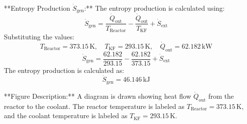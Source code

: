 **Entropy Production \( \dot{S}_{\text{gen}} \):**  
The entropy production is calculated using:  
\[
\dot{S}_{\text{gen}} = \frac{\dot{Q}_{\text{out}}}{T_{\text{Reactor}}} - \frac{\dot{Q}_{\text{out}}}{T_{\text{KF}}} + \dot{S}_{\text{ext}}
\]  
Substituting the values:  
\[
T_{\text{Reactor}} = 373.15 \, \text{K}, \quad T_{\text{KF}} = 293.15 \, \text{K}, \quad \dot{Q}_{\text{out}} = 62.182 \, \text{kW}
\]  
\[
\dot{S}_{\text{gen}} = \frac{62.182}{293.15} - \frac{62.182}{373.15} + \dot{S}_{\text{ext}}
\]  
The entropy production is calculated as:  
\[
\dot{S}_{\text{gen}} = 46.146 \, \text{kJ}
\]  

**Figure Description:**  
A diagram is drawn showing heat flow \( \dot{Q}_{\text{out}} \) from the reactor to the coolant. The reactor temperature is labeled as \( T_{\text{Reactor}} = 373.15 \, \text{K} \), and the coolant temperature is labeled as \( T_{\text{KF}} = 293.15 \, \text{K} \).